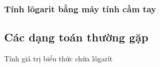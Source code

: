 \begin{tomtat}
	\subsubsection{Tính lôgarit bằng máy tính cầm tay}
	
%	
\end{tomtat}
\setcounter{subsubsection}{0}
\setcounter{ex}{0}
\setcounter{bt}{0}
\subsection{Các dạng toán thường gặp}
\begin{dang}{Tính giá trị biểu thức chứa lôgarít}
\end{dang}

